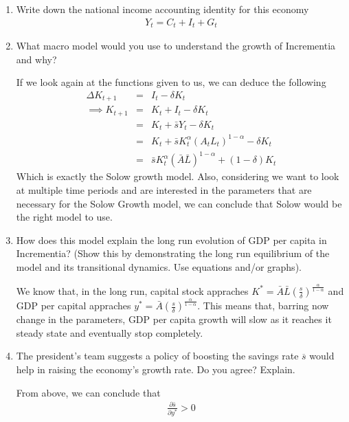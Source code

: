\documentclass[11pt]{SelfArxOneColBMN}
\begin{document}
\begin{enumerate}[label=\alph*]
  \item Write down the national income accounting identity for this economy
  \begin{eqnarray*}
      Y_t = C_t + I_t + G_t
  \end{eqnarray*}
  \item What macro model would you use to understand the growth of Incrementia and why?
  \begin{solution}
    If we look again at the functions given to us, we can deduce the following
    \begin{eqnarray*}
      \Delta K_{t+1} &=& I_t - \delta K_t\\
      \implies K_{t+1} &=& K_t + I_t - \delta K_t\\
      &=& K_t + \bar{s}Y_t - \delta K_t\\
      &=& K_t + \bar{s}K_t^\alpha(A_tL_t)^{1-\alpha} - \delta K_t\\
      &=& \bar{s}K_t^\alpha(\bar{A}\bar{L})^{1 - \alpha} + (1 - \delta)K_t
    \end{eqnarray*}
    Which is exactly the Solow growth model. Also, considering we want to look at multiple time periods and are interested in the parameters that are necessary for the Solow Growth model, we can conclude that Solow would be the right model to use. 
  \end{solution}
  \item How does this model explain the long run evolution of GDP per capita in Incrementia? (Show this by demonstrating the long run equilibrium of the model and its transitional dynamics. Use equations and/or graphs).
  \begin{solution}
    We know that, in the long run, capital stock appraches $K^* = \bar{A}\bar{L}(\frac{s}{\delta})^\frac{\alpha}{1 - \alpha}$ and GDP per capital appraches $y^* = \bar{A}(\frac{s}{\delta})^\frac{\alpha}{1 - \alpha}$. This means that, barring now change in the parameters, GDP per capita growth will slow as it reaches it steady state and eventually stop completely.
  \end{solution} 
  \item The president's team suggests a policy of boosting the savings rate $\overline{s}$ would help in raising the economy's growth rate. Do you agree? Explain.
  \begin{solution}
    From above, we can conclude that
    \begin{eqnarray*}
      \frac{\partial \bar{s}}{\partial y^*} > 0

\end{eqnarray*}
\end{solution}
\end{enumerate}
\end{document}

